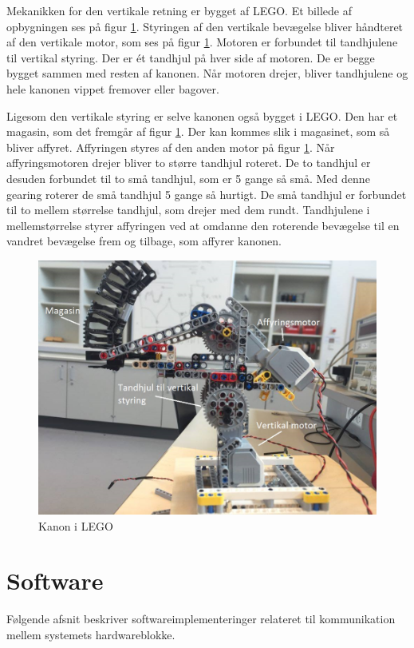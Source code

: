 \noindent Mekanikken for den vertikale retning er bygget af LEGO. Et billede af opbygningen ses på figur \ref{fig:kanon}. Styringen af den vertikale bevægelse bliver håndteret af den vertikale motor, som ses på figur \ref{fig:kanon}. Motoren er forbundet til tandhjulene til vertikal styring. Der er ét tandhjul på hver side af motoren. De er begge bygget sammen med resten af kanonen. Når motoren drejer, bliver tandhjulene og hele kanonen vippet fremover eller bagover. \newline 

\noindent Ligesom den vertikale styring er selve kanonen også bygget i LEGO. Den har et magasin, som det fremgår af figur \ref{fig:kanon}. Der kan kommes slik i magasinet, som så bliver affyret. Affyringen styres af den anden motor på figur \ref{fig:kanon}. Når affyringsmotoren drejer bliver to større tandhjul roteret. De to tandhjul er desuden forbundet til to små tandhjul, som er 5 gange så små. Med denne gearing roterer de små tandhjul 5 gange så hurtigt. De små tandhjul er forbundet til to mellem størrelse tandhjul, som drejer med dem rundt. Tandhjulene i mellemstørrelse styrer affyringen ved at omdanne den roterende bevægelse til en vandret bevægelse frem og tilbage, som affyrer kanonen. \newline 

\begin{figure}[H]
	\centering
	\includegraphics[width=1\textwidth]{Afsnit/DesignOgImplementering/images/kanon}
	\caption{Kanon i LEGO}
	\label{fig:kanon}
\end{figure}
 

\section{Software}
Følgende afsnit beskriver softwareimplementeringer relateret til kommunikation mellem systemets hardwareblokke.

